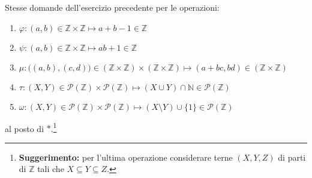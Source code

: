 \begin{exsbox}
	Stesse domande dell'esercizio precedente per le operazioni:
	\begin{enumerate}
		\item $\varphi:(a,b) \in \mathbb{Z} \times \mathbb{Z}  \mapsto a+b-1 \in \mathbb{Z}$
		\item $\psi : (a,b) \in \mathbb{Z} \times \mathbb{Z} \mapsto ab+1 \in \mathbb{Z}$
		\item $\mu : \bigl((a,b),(c,d)\bigr) \in (\mathbb{Z} \times \mathbb{Z}) \times (\mathbb{Z} \times \mathbb{Z}) \mapsto (a+bc,bd) \in (\mathbb{Z} \times \mathbb{Z})$
		\item $\tau:(X,Y)\in \mathcal{P}(\mathbb{Z}) \times \mathcal{P}(\mathbb{Z}) \mapsto (X \cup Y) \cap \mathbb{N} \in \mathcal{P}(\mathbb{Z})$
		\item $\omega: (X,Y)\in \mathcal{P}(\mathbb{Z}) \times \mathcal{P}(\mathbb{Z}) \mapsto (X \setminus Y) \cup \{1\} \in \mathcal{P}(\mathbb{Z})$
	\end{enumerate}
	al posto di $\ast$.\footnote{\textbf{Suggerimento:} per l'ultima operazione considerare terne $(X,Y,Z)$ di parti di $\mathbb{Z}$ tali che $X \subseteq Y \subseteq Z$.}
\end{exsbox}
